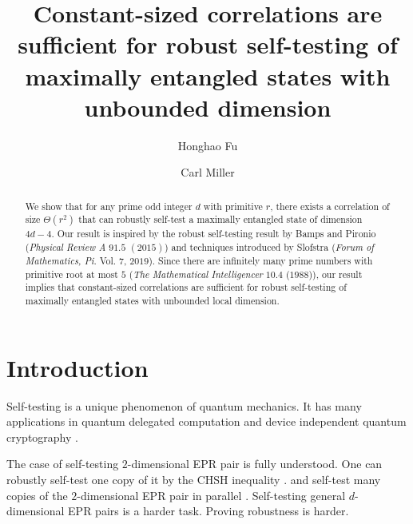 \documentclass[11pt,letterpaper]{article}
\newcommand{\1}{\mathbb{1}}
\theoremstyle{definition}
\begin{document}
\title{Constant-sized correlations are sufficient for 
robust self-testing of maximally entangled states with unbounded dimension}

\author[1]{Honghao Fu}
\author[1,2]{Carl Miller}

\renewcommand\Affilfont{\itshape\small}



\maketitle

\begin{abstract}
	We show that for any prime odd integer $d$ with primitive $r$, there exists a correlation of size
	$\Theta(r^2)$ 
	that can robustly self-test a maximally entangled state of dimension $4d-4$. Our result is
	inspired by the robust self-testing result by Bamps and Pironio (\textit{Physical Review A} $91.5$ $(2015)$) and
	techniques introduced by Slofstra (\textit{Forum of Mathematics, Pi}. Vol. $7$, $2019$). Since there are
	infinitely many prime numbers with primitive root at most $5$ (\textit{The Mathematical Intelligencer} $10.4$ ($1988$)), 
	our result implies that constant-sized correlations are sufficient for robust self-testing of maximally entangled states
	with unbounded local dimension.
\end{abstract}
\section{Introduction}
\label{sec:intro}
Self-testing is a unique phenomenon of quantum mechanics. It has many applications in quantum
delegated computation \cite{ruv2013,cgsv2017} and device independent quantum cryptography
\cite{qkd2011,qkd2014,miller2016,fu2018,eat2018}.

The case of self-testing $2$-dimensional EPR pair is fully understood. One can robustly self-test
one copy of it by the CHSH inequality \cite{bamps2015}. and self-test many copies of the $2$-dimensional EPR
pair in parallel \cite{mckague2016, coladan2017parallel}. 
Self-testing general $d$-dimensional EPR pairs is a harder task.
Proving robustness is harder.
\end{document}
